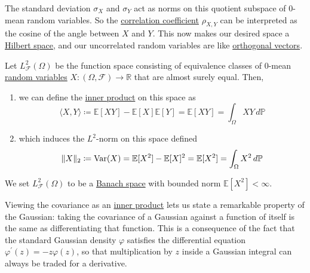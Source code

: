   The standard deviation $\sigma_X$ and $\sigma_Y$ act as norms on this quotient subspace of $0$-mean random variables. So the \hyperref[def:correlation-coefficient]{correlation coefficient} $\rho_{X, Y}$ can be interpreted as the cosine of the angle between $X$ and $Y$. This now makes our desired space a \hyperref[fa-def:hilbert-space]{Hilbert space}, and our uncorrelated random variables are like \hyperref[lin-def:orthogonal-vectors]{orthogonal vectors}. 

  \begin{definition}
    \label{def:the-hilbert-space-l2fomega}
    Let $L^2_\mathcal{F} (\Omega)$ be the function space consisting of equivalence classes of $0$-mean \hyperref[def:random-variable]{random variables} $X: (\Omega, \mathcal{F}) \rightarrow \mathbb{R}$ that are almost surely equal. Then, 
    \begin{enumerate}
      \item we can define the \hyperref[lin-def:inner-product]{inner product} on this space as 
      \begin{equation}
        \langle X, Y \rangle \coloneqq \mathbb{E}[X Y] - \mathbb{E}[X] \mathbb{E}[Y] = \mathbb{E}[X Y] = \int_\Omega X Y \,d\mathbb{P}
      \end{equation}

      \item which induces the $L^2$-norm on this space defined 
      \begin{equation}
        \|X\|_2 \coloneqq \operatorname{Var}(X) = \mathbb{E}[X^2] - \mathbb{E}[X]^2 = \mathbb{E}[X^2] = \int_\Omega X^2 \,d\mathbb{P}
      \end{equation}
    \end{enumerate}
    We set $L^2_\mathcal{F} (\Omega)$ to be a \hyperref[mv-def:banach-space]{Banach space} with bounded norm $\mathbb{E}[X^2] < \infty$. 
  \end{definition}

  Viewing the covariance as an \hyperref[lin-def:inner-product]{inner product} lets us state a remarkable property of the Gaussian: taking the covariance of a Gaussian against a function of itself is the same as differentiating that function. This is a consequence of the fact that the standard Gaussian density $\varphi$ satisfies the differential equation $\varphi^\prime (z) = - z \varphi(z)$, so that multiplication by $z$ inside a Gaussian integral can always be traded for a derivative. 

